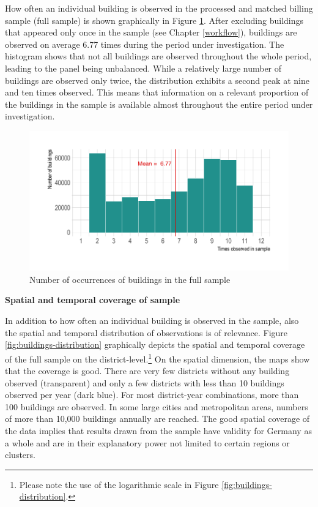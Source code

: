 \documentclass[12pt,twoside]{reedthesis}
\begin{document}
How often an individual building is observed in the processed and matched billing sample (full sample) is shown graphically in Figure \ref{fig:occurrence-buildings}. After excluding buildings that appeared only once in the sample (see Chapter \ref{workflow}), buildings are observed on average 6.77 times during the period under investigation. The histogram shows that not all buildings are observed throughout the whole period, leading to the panel being unbalanced. While a relatively large number of buildings are observed only twice, the distribution exhibits a second peak at nine and ten times observed. This means that information on a relevant proportion of the buildings in the sample is available almost throughout the entire period under investigation.
\begin{figure}

{\centering \includegraphics[width=0.75\linewidth]{figure/occurance_buildings} 

}

\caption{Number of occurrences of buildings in the full sample}\label{fig:occurrence-buildings}
\end{figure}
\textbf{Spatial and temporal coverage of sample}

In addition to how often an individual building is observed in the sample, also the spatial and temporal distribution of observations is of relevance. Figure \ref{fig:buildings-distribution} graphically depicts the spatial and temporal coverage of the full sample on the district-level.\footnote{Please note the use of the logarithmic scale in Figure \ref{fig:buildings-distribution}.} On the spatial dimension, the maps show that the coverage is good. There are very few districts without any building observed (transparent) and only a few districts with less than 10 buildings observed per year (dark blue). For most district-year combinations, more than 100 buildings are observed. In some large cities and metropolitan areas, numbers of more than 10,000 buildings annually are reached. The good spatial coverage of the data implies that results drawn from the sample have validity for Germany as a whole and are in their explanatory power not limited to certain regions or clusters.
\end{document}

